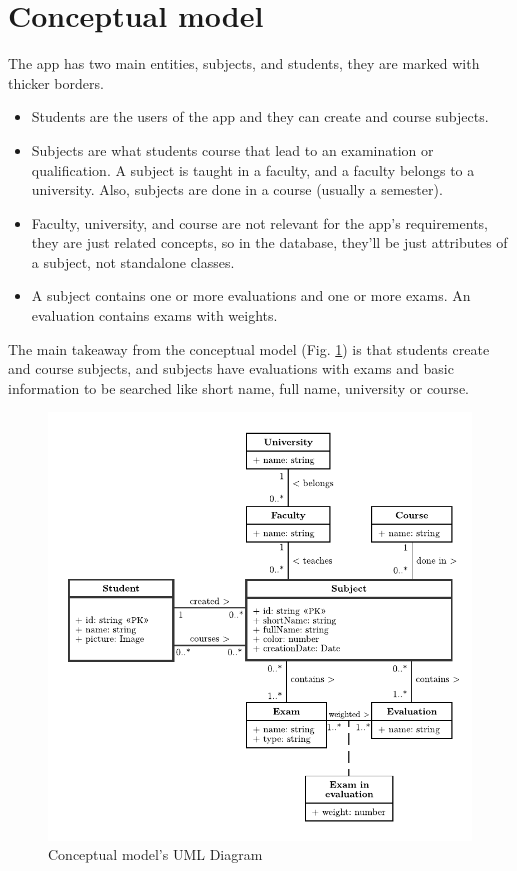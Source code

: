 \section{Conceptual model}

The app has two main entities, subjects, and students, they are marked with thicker borders. 
\begin{itemize}
    \item Students are the users of the app and they can create and course subjects.
    \item Subjects are what students course that lead to an examination or qualification. A subject is taught in a faculty, and a faculty belongs to a university. Also, subjects are done in a course (usually a semester). 
    \item Faculty, university, and course are not relevant for the app's requirements, they are just related concepts, so in the database, they'll be just attributes of a subject, not standalone classes.
    \item A subject contains one or more evaluations and one or more exams. An evaluation contains exams with weights.
\end{itemize}

The main takeaway from the conceptual model (Fig. \ref{fig:conceptual-model}) is that students create and course subjects, and subjects have evaluations with exams and basic information to be searched like short name, full name, university or course. 

\vfill
\begin{figure}[ht!]
    \center
    \includegraphics[width=\linewidth]{media/diagrams/conceptual.pdf}
    \caption{Conceptual model's UML Diagram}
    \label{fig:conceptual-model}
\end{figure}
\vfill
